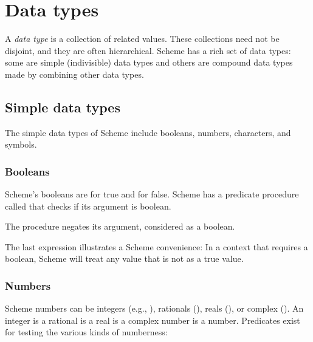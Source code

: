 \chapter{Data types}

A {\em data type} is a collection of related values.
These collections
need not be disjoint, and they are often hierarchical.
Scheme has a rich set of data types: some are simple
(indivisible) data types and others are compound data types
made by combining other data types.


\section{Simple data types}

The simple data types of Scheme include booleans, numbers,
characters, and symbols.



\subsection{Booleans}
\label{booleans}

Scheme’s booleans are  for true and  for false.
Scheme has a predicate procedure called  that
checks if its argument is boolean.



\n The procedure  negates its argument, considered as a
boolean.


\n The last expression illustrates a Scheme convenience:
In a context that requires a boolean, Scheme will treat
any value that is not  as a true value.



\subsection{Numbers}

Scheme numbers can be integers (e.g., ), rationals
(), reals (), or complex ().  An
integer is a rational is a real is a complex number is a
number.  Predicates exist for testing the various kinds of
numberness:

